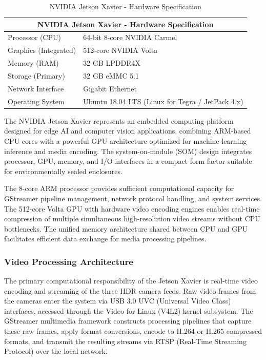 \documentclass{erauthesis}
\begin{document}
\begin{table}[htpb]
\centering
\caption{NVIDIA Jetson Xavier - Hardware Specification}
\begin{tabular}{ll}
\hline
\multicolumn{2}{c}{NVIDIA Jetson Xavier - Hardware Specification} \\
\hline
\hline
Processor (CPU) & 64-bit 8-core NVIDIA Carmel \\
Graphics (Integrated) & 512-core NVIDIA Volta \\
Memory (RAM) & 32 GB LPDDR4X \\
Storage (Primary) & 32 GB eMMC 5.1 \\
Network Interface & Gigabit Ethernet \\
Operating System & Ubuntu 18.04 LTS (Linux for Tegra / JetPack 4.x) \\
\hline
\end{tabular}
\label{table:Xavier_hardware}
\end{table}


The NVIDIA Jetson Xavier represents an embedded computing platform designed for edge AI and computer vision applications, combining ARM-based CPU cores with a powerful GPU architecture optimized for machine learning inference and media encoding. The system-on-module (SOM) design integrates processor, GPU, memory, and I/O interfaces in a compact form factor suitable for environmentally sealed enclosures.

The 8-core ARM processor provides sufficient computational capacity for GStreamer pipeline management, network protocol handling, and system services. The 512-core Volta GPU with hardware video encoding engines enables real-time compression of multiple simultaneous high-resolution video streams without CPU bottlenecks. The unified memory architecture shared between CPU and GPU facilitates efficient data exchange for media processing pipelines.

\subsubsection{Video Processing Architecture}

The primary computational responsibility of the Jetson Xavier is real-time video encoding and streaming of the three HDR camera feeds. Raw video frames from the cameras enter the system via USB 3.0 UVC (Universal Video Class) interfaces, accessed through the Video for Linux (V4L2) kernel subsystem. The GStreamer multimedia framework constructs processing pipelines that capture these raw frames, apply format conversions, encode to H.264 or H.265 compressed formats, and transmit the resulting streams via RTSP (Real-Time Streaming Protocol) over the local network.
\end{document}
